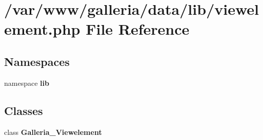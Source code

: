 \section{/var/www/galleria/data/lib/viewelement.php File Reference}
\label{viewelement_8php}
\subsection*{Namespaces}
\begin{CompactItemize}
\item 
namespace {\bf lib}
\end{CompactItemize}
\subsection*{Classes}
\begin{CompactItemize}
\item 
class {\bf Galleria\_\-Viewelement}
\end{CompactItemize}
